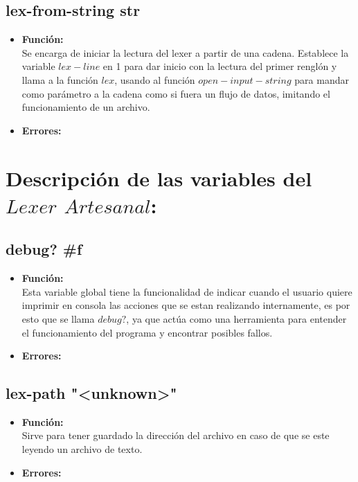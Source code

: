 \documentclass{article}
\begin{document}
\subsection{lex-from-string str}
\begin{itemize}
    \item \textbf{Función:} \\
    Se encarga de iniciar la lectura del lexer a partir de una cadena. Establece la variable $lex-line$ en 1 para dar inicio con la lectura del primer renglón y llama a la función $lex$, usando al función $open-input-string$ para mandar como parámetro a la cadena como si fuera un flujo de datos, imitando el funcionamiento de un archivo.
    \item \textbf{Errores:} \\
\end{itemize}
\section{Descripción de las variables del $Lexer$ $Artesanal$:}
\subsection{debug? \#f}
\begin{itemize}
    \item \textbf{Función:} \\
    Esta variable global tiene la funcionalidad de indicar cuando el usuario quiere imprimir en consola las acciones que se estan realizando internamente, es por esto que se llama $debug?$, ya que actúa como una herramienta para entender el funcionamiento del programa y encontrar posibles fallos.
    \item \textbf{Errores:} \\ 
\end{itemize}
\subsection{lex-path "\textless unknown\textgreater"}
\begin{itemize}
    \item \textbf{Función:} \\
    Sirve para tener guardado la dirección del archivo en caso de que se este leyendo un archivo de texto.
    \item \textbf{Errores:} \\ 
\end{itemize}
\end{document}
